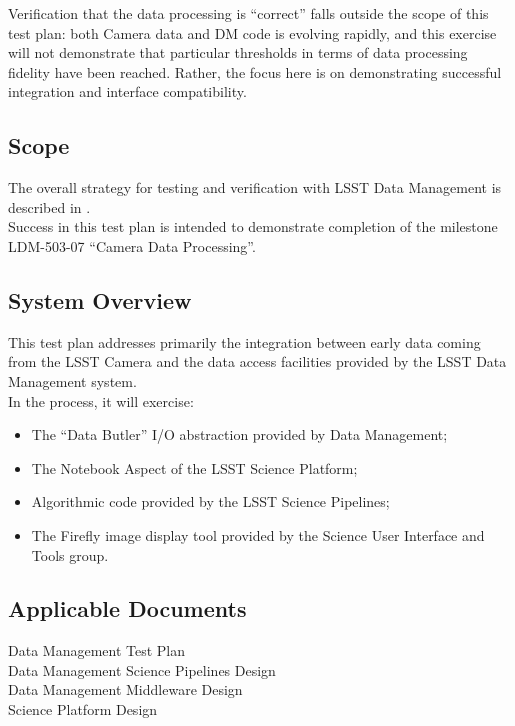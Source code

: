 \documentclass[DM,lsstdraft,STR,toc]{lsstdoc}
\providecommand{\tightlist}{
  \setlength{\itemsep}{0pt}\setlength{\parskip}{0pt}}
\begin{document}
Verification that the data processing is ``correct'' falls outside the
scope of this test plan: both Camera data and DM code is evolving
rapidly, and this exercise will not demonstrate that particular
thresholds in terms of data processing fidelity have been reached.
Rather, the focus here is on demonstrating successful integration and
interface compatibility.\\[2\baselineskip]

\subsection{Scope}\label{scope}

The overall strategy for testing and verification with LSST Data
Management is described in .\\
Success in this test plan is intended to demonstrate completion of the
milestone LDM-503-07 ``Camera Data Processing''.



\subsection{System Overview}
\label{sect:systemoverview}

This test plan addresses primarily the integration between early data
coming from the LSST Camera and the data access facilities provided by
the LSST Data Management system.\\[2\baselineskip]In the process, it
will exercise:

\begin{itemize}
\tightlist
\item
  The ``Data Butler'' I/O abstraction provided by Data Management;
\item
  The Notebook Aspect of the LSST Science Platform;
\item
  Algorithmic code provided by the LSST Science Pipelines;
\item
  The Firefly image display tool provided by the Science User Interface
  and Tools group.
\end{itemize}

\subsection{Applicable Documents}\label{applicable-documents}

 Data Management Test Plan\\
 Data Management Science Pipelines Design\\
 Data Management Middleware Design\\
 Science Platform Design
\end{document}
